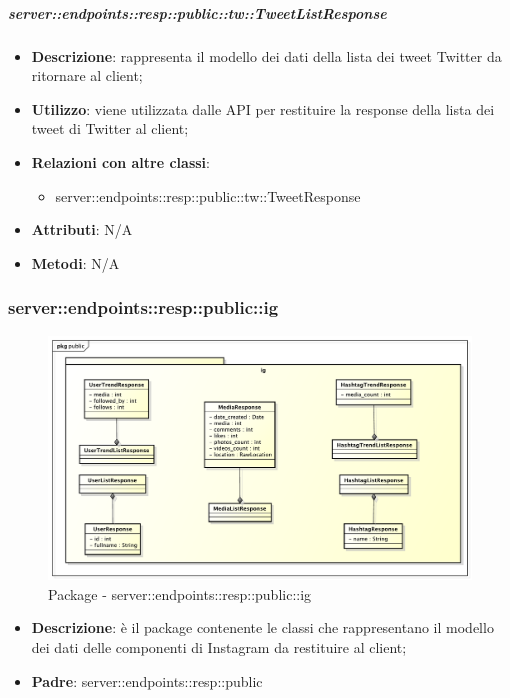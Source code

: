     \subparagraph{server::endpoints::resp::public::tw::TweetListResponse} %
    \label{subp:bdsm_app_server_endpoints_resp_public_tw_tweetlistresponse}
    \begin{itemize}
      \item \textbf{Descrizione}: rappresenta il modello dei dati della lista dei tweet Twitter da ritornare al client;
      \item \textbf{Utilizzo}: viene utilizzata dalle API per restituire la response della lista dei tweet di Twitter al client;
      \item \textbf{Relazioni con altre classi}:
        \begin{itemize}
          \item server::endpoints::resp::public::tw::TweetResponse
        \end{itemize}
	  \item \textbf{Attributi}: N/A
	  \item \textbf{Metodi}: N/A
    \end{itemize}

\subsubsection{server::endpoints::resp::public::ig} %
\label{ssub:bdsm_app_server_endpoints_resp_public_ig}
\begin{figure}[!htbp]
	\centering
	\centerline{\includegraphics[scale=0.5]{./images/server/resp_ig.pdf}}
	\caption{Package - server::endpoints::resp::public::ig}
\end{figure}

\begin{itemize}
  \item \textbf{Descrizione}: è il package contenente le classi che rappresentano il modello dei dati delle componenti di Instagram da restituire al client;
  \item \textbf{Padre}: server::endpoints::resp::public
\end{itemize}

